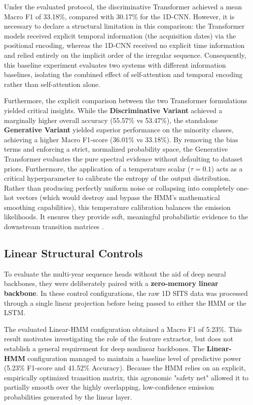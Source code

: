 Under the evaluated protocol, the discriminative Transformer achieved a mean Macro F1
of 33.18\%, compared with 30.17\% for the 1D-CNN.
However, it is necessary to declare a structural limitation in this comparison: the Transformer models received
explicit temporal information (the acquisition dates) via the positional encoding, whereas the 1D-CNN received no
explicit time information and relied entirely on the implicit order of the irregular sequence.
Consequently, this baseline experiment evaluates two systems with different information baselines,
isolating the combined effect of self-attention and temporal encoding rather than self-attention alone.

Furthermore, the explicit comparison between the two Transformer formulations yielded critical insights.
While the \textbf{Discriminative Variant} achieved a marginally higher overall accuracy (55.57\% vs 53.47\%),
the standalone \textbf{Generative Variant} yielded superior performance on the minority classes,
achieving a higher Macro F1-score (36.01\% vs 33.18\%).
By removing the bias terms and enforcing a strict, normalized probability space,
the Generative Transformer evaluates the pure spectral evidence without defaulting to dataset priors. 
Furthermore, the application of a temperature scalar ($\tau = 0.1$) acts as a critical
hyperparameter to calibrate the entropy of the output distribution.
Rather than producing perfectly uniform noise or collapsing into completely
one-hot vectors (which would destroy and bypass the HMM's mathematical smoothing capabilities),
this temperature calibration balances the emission likelihoods.
It ensures they provide soft, meaningful probabilistic evidence to the downstream transition matrices \cite{perantoni_bayesian_2024}.

\subsection{Linear Structural Controls}
To evaluate the multi-year sequence heads without the aid of deep neural backbones,
they were deliberately paired with a \textbf{zero-memory linear backbone}.
In these control configurations, the raw 1D SITS data was processed through a single linear projection before being passed to either the HMM or the LSTM.

The evaluated Linear-HMM configuration obtained a Macro F1 of 5.23\%.
This result motivates investigating the role of the feature extractor,
but does not establish a general requirement for deep nonlinear backbones.
The \textbf{Linear-HMM} configuration managed to maintain a baseline level of predictive power (5.23\% F1-score and 41.52\% Accuracy).
Because the HMM relies on an explicit, empirically optimized transition matrix, this agronomic "safety net" allowed it to partially smooth over the highly overlapping,
low-confidence emission probabilities generated by the linear layer. 

